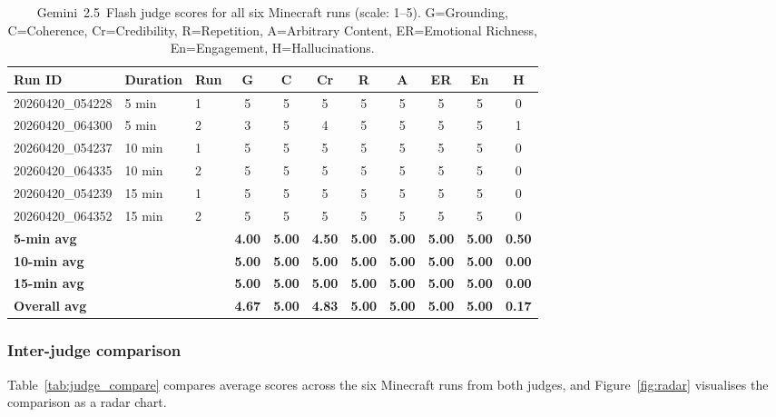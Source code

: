 \documentclass[11pt]{article}
\begin{document}
\begin{table}[h]
\centering
\caption{Gemini~2.5~Flash judge scores for all six Minecraft runs (scale: 1--5). G=Grounding, C=Coherence, Cr=Credibility, R=Repetition, A=Arbitrary Content, ER=Emotional Richness, En=Engagement, H=Hallucinations.}
\label{tab:auto_scores}
\begin{tabular}{lllcccccccc}
\toprule
Run ID & Duration & Run & G & C & Cr & R & A & ER & En & H \\
\midrule
20260420\_054228 & 5 min  & 1 & 5 & 5 & 5 & 5 & 5 & 5 & 5 & 0 \\
20260420\_064300 & 5 min  & 2 & 3 & 5 & 4 & 5 & 5 & 5 & 5 & 1 \\
20260420\_054237 & 10 min & 1 & 5 & 5 & 5 & 5 & 5 & 5 & 5 & 0 \\
20260420\_064335 & 10 min & 2 & 5 & 5 & 5 & 5 & 5 & 5 & 5 & 0 \\
20260420\_054239 & 15 min & 1 & 5 & 5 & 5 & 5 & 5 & 5 & 5 & 0 \\
20260420\_064352 & 15 min & 2 & 5 & 5 & 5 & 5 & 5 & 5 & 5 & 0 \\
\midrule
\textbf{5-min avg}   & & & \textbf{4.00} & \textbf{5.00} & \textbf{4.50} & \textbf{5.00} & \textbf{5.00} & \textbf{5.00} & \textbf{5.00} & \textbf{0.50} \\
\textbf{10-min avg}  & & & \textbf{5.00} & \textbf{5.00} & \textbf{5.00} & \textbf{5.00} & \textbf{5.00} & \textbf{5.00} & \textbf{5.00} & \textbf{0.00} \\
\textbf{15-min avg}  & & & \textbf{5.00} & \textbf{5.00} & \textbf{5.00} & \textbf{5.00} & \textbf{5.00} & \textbf{5.00} & \textbf{5.00} & \textbf{0.00} \\
\textbf{Overall avg} & & & \textbf{4.67} & \textbf{5.00} & \textbf{4.83} & \textbf{5.00} & \textbf{5.00} & \textbf{5.00} & \textbf{5.00} & \textbf{0.17} \\
\bottomrule
\end{tabular}
\end{table}

\subsubsection*{Inter-judge comparison}

Table~\ref{tab:judge_compare} compares average scores across the six Minecraft runs from both judges, and Figure~\ref{fig:radar} visualises the comparison as a radar chart.
\end{document}
